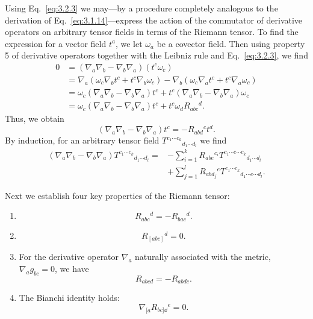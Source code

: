 Using Eq.~\eqref{eq:3.2.3} we may---by a procedure completely analogous to the
derivation of Eq.~\eqref{eq:3.1.14}---express the action of the commutator of derivative
operators on arbitrary tensor fields in terms of the Riemann tensor. To find the
expression for a vector field $t^a$, we let $\omega_a$ be a covector field. Then using property
5 of derivative operators together with the Leibniz rule and Eq.~\eqref{eq:3.2.3}, we find
\begin{equation}
  \begin{aligned}
    0
    &=(\nabla_a\nabla_b-\nabla_b\nabla_a)(t^c\omega_c)\\
    &=\nabla_a(\omega_c\nabla_bt^c+t^c\nabla_b\omega_c)
      -\nabla_b(\omega_c\nabla_at^c+t^c\nabla_a\omega_c)\\
    &=\omega_c(\nabla_a\nabla_b-\nabla_b\nabla_a)t^c
      +t^c(\nabla_a\nabla_b-\nabla_b\nabla_a)\omega_c\\
    &=\omega_c(\nabla_a\nabla_b-\nabla_b\nabla_a)t^c+t^c\omega_dR_{abc}{}^d.
  \end{aligned}
  \tag{3.2.10}\label{eq:3.2.10}
\end{equation}
Thus, we obtain
\begin{equation}
  (\nabla_a\nabla_b-\nabla_b\nabla_a)t^c=-R_{abd}{}^ct^d.
  \tag{3.2.11}\label{eq:3.2.11}
\end{equation}
By induction, for an arbitrary tensor field $T^{c_1\cdots c_k}{}_{d_1\cdots d_l}$ we find
\begin{equation}
  \begin{aligned}
    (\nabla_a\nabla_b-\nabla_b\nabla_a)T^{c_1\cdots c_k}{}_{d_1\cdots d_l}
    ={}&-\sum_{i=1}^{k}R_{abe}{}^{c_i}
    T^{c_1\cdots e\cdots c_k}{}_{d_1\cdots d_l}\\
    &+\sum_{j=1}^{l}R_{abd_j}{}^e
    T^{c_1\cdots c_k}{}_{d_1\cdots e\cdots d_l}.
  \end{aligned}
  \tag{3.2.12}\label{eq:3.2.12}
\end{equation}

Next we establish four key properties of the Riemann tensor:
\begin{enumerate}[label=\arabic*.,leftmargin=*]
\item
\begin{equation}
  R_{abc}{}^d=-R_{bac}{}^d.
  \tag{3.2.13}\label{eq:3.2.13}
\end{equation}
\item
\begin{equation}
  R_{[abc]}{}^d=0.
  \tag{3.2.14}\label{eq:3.2.14}
\end{equation}
\item For the derivative operator $\nabla_a$ naturally associated with the metric, $\nabla_ag_{bc}=0$, we
have
\begin{equation}
  R_{abcd}=-R_{abdc}.
  \tag{3.2.15}\label{eq:3.2.15}
\end{equation}
\item The Bianchi identity holds:
\begin{equation}
  \nabla_{[a}R_{bc]\dd}{}^e=0.
  \tag{3.2.16}\label{eq:3.2.16}
\end{equation}
\end{enumerate}

